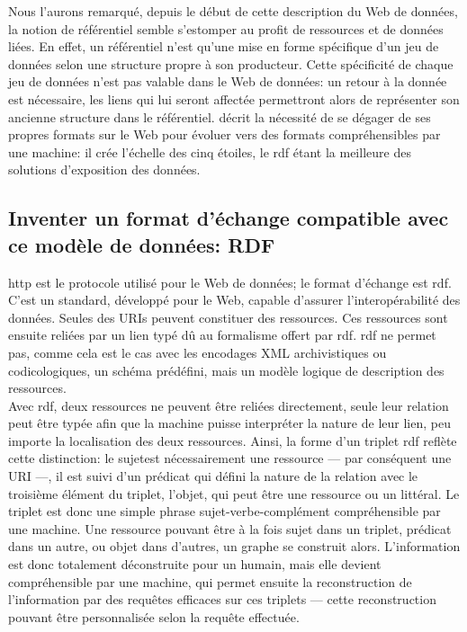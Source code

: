 Nous l'aurons remarqué, depuis le début de cette description du Web de données, la notion de référentiel semble s'estomper au profit de ressources et de données liées. En effet, un référentiel n'est qu'une mise en forme spécifique d'un jeu de données selon une structure propre à son producteur. Cette spécificité de chaque jeu de données n'est pas valable dans le Web de données: un retour à la donnée est nécessaire, les liens qui lui seront affectée permettront alors de représenter son ancienne structure dans le référentiel.  décrit la nécessité de se dégager de ses propres formats sur le Web pour évoluer vers des formats compréhensibles par une machine: il crée l'échelle des cinq étoiles, le \ac{rdf} étant la meilleure des solutions d'exposition des données.

\subsection{\label{II-A-1-b}Inventer un format d'échange compatible avec ce modèle de données: RDF}

\ac{http} est le protocole utilisé pour le Web de données; le format d'échange est \ac{rdf}. C'est un standard, développé pour le Web, capable d'assurer l'interopérabilité des données. Seules des URIs peuvent constituer des ressources. Ces ressources sont ensuite reliées par un lien typé dû au formalisme offert par \ac{rdf}. \ac{rdf} ne permet pas, comme cela est le cas avec les encodages XML archivistiques ou codicologiques, un schéma prédéfini, mais un modèle logique de description des ressources.\\

Avec \ac{rdf}, deux ressources ne peuvent être reliées directement, seule leur relation peut être typée afin que la machine puisse interpréter la nature de leur lien, peu importe la localisation des deux ressources. Ainsi, la forme d'un triplet \ac{rdf} reflète cette distinction: le \og sujet\fg est nécessairement une ressource --- par conséquent une URI ---, il est suivi d'un \og prédicat\fg{} qui défini la nature de la relation avec le troisième élément du triplet, l'\og objet\fg{}, qui peut être une ressource ou un littéral. Le triplet est donc une simple phrase sujet-verbe-complément compréhensible par une machine. Une ressource pouvant être à la fois sujet dans un triplet, prédicat dans un autre, ou objet dans d'autres, un graphe se construit alors. L'information est donc totalement déconstruite pour un humain, mais elle devient compréhensible par une machine, qui permet ensuite la reconstruction de l'information par des requêtes efficaces sur ces triplets --- cette reconstruction pouvant être personnalisée selon la requête effectuée.

